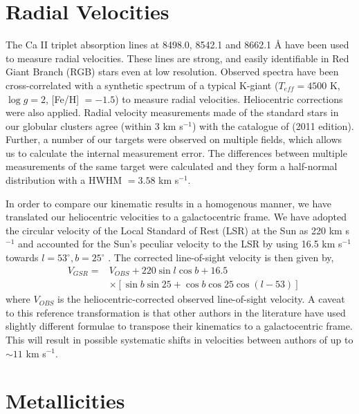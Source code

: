 \section{Radial Velocities}
\label{sec:ch1-kinematics}

The Ca II triplet absorption lines at 8498.0, 8542.1 and 8662.1 \AA{}  have been used to measure radial velocities. These lines are strong, and easily identifiable in Red Giant Branch (RGB) stars even at low resolution.  Observed spectra have been cross-correlated with a synthetic spectrum of a typical K-giant ($T_{eff} = 4500$ K, $\log{g} = 2$, [Fe/H] $= -1.5$) to measure radial velocities. Heliocentric corrections were also applied. Radial velocity measurements made of the standard stars in our globular clusters agree (within 3 km s$^{-1}$) with the catalogue of \citet{Harris_1996} (2011 edition). Further, a number of our targets were observed on multiple fields, which allows us to calculate the internal measurement error. The differences between multiple measurements of the same target were calculated and they form a half-normal distribution with a HWHM $= 3.58$ km s$^{-1}$. 
	
In order to compare our kinematic results in a homogenous manner, we have translated our heliocentric velocities to a galactocentric frame. We have adopted the circular velocity of the Local Standard of Rest (LSR) at the Sun as 220 km s$^{-1}$ \citep{Kerr;Lynden-Bell_1986} and accounted for the Sun's peculiar velocity to the LSR by using 16.5 km s$^{-1}$ towards $l = 53^\circ, b = 25^\circ$ \citep{Mihalas;Binney_1981}. The corrected line-of-sight velocity is then given by,
\begin{eqnarray}
	&V_{GSR} = & V_{OBS} + 220\sin{l}\cos{b} + 16.5  \\
	& 		 &\times[\sin{b}\sin{25} + \cos{b}\cos{25}\cos{(l - 53)}] \nonumber
\end{eqnarray}
\noindent where $V_{OBS}$ is the heliocentric-corrected observed line-of-sight velocity. A caveat to this reference transformation is that other authors in the literature have used slightly different formulae to transpose their kinematics to a galactocentric frame. This will result in possible systematic shifts in velocities between authors of up to $\sim11$ km s$^{-1}$. 



\section{Metallicities}
\label{sec:ch1-metallicities}

